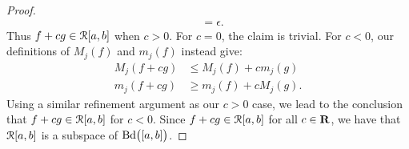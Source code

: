 \documentclass[10pt,twoside,openany]{memoir}
\begin{document}
\begin{proof}
\begin{equation*}
\begin{split}
                    & = \epsilon.
                \end{split}
                \end{equation*}
            Thus $f+cg \in \mathcal{R}[a,b]$ when $c > 0$. For $c = 0$, the claim is trivial. For $c < 0$, our definitions of $M_j(f)$ and $m_j(f)$ instead give:
                \begin{equation*}
                \begin{split}
                    M_j(f + cg) &\leq M_j(f) + cm_j(g) \\
                    m_j(f + cg) &\geq m_j(f) + cM_j(g).
                \end{split}
                \end{equation*}
            Using a similar refinement argument as our $c > 0$ case, we lead to the conclusion that $f+cg \in \mathcal{R}[a,b]$ for $c < 0$. Since $f+cg \in \mathcal{R}[a,b]$ for all $c \in \mathbf{R}$, we have that $\mathcal{R}[a,b]$ is a subspace of $\operatorname{Bd}\bigl([a,b]\bigr)$.
        \end{proof}
\end{document}
